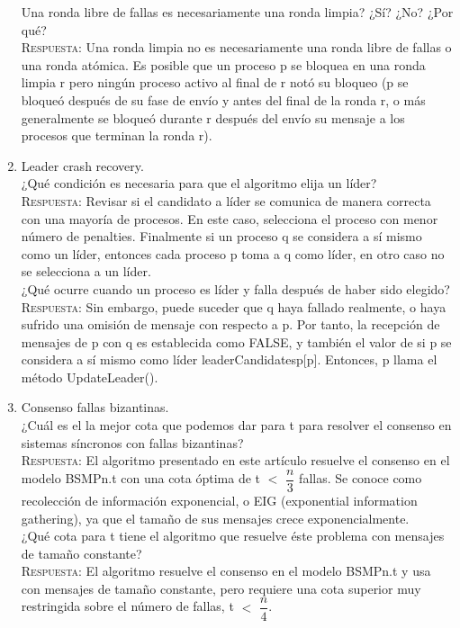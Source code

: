 \documentclass[letterpaper,10pt]{article}
\begin{document}
\begin{enumerate}
    Una ronda libre de fallas es necesariamente una ronda limpia? ¿Sí? ¿No? ¿Por qué?\\
    \textsc{Respuesta:}
	Una ronda limpia no es necesariamente una ronda libre de fallas o una ronda atómica. Es posible que un proceso p se bloquea en una ronda limpia r pero ningún proceso activo al final de r notó su bloqueo (p se bloqueó después de su fase de envío y antes del final de la ronda r, o más generalmente se bloqueó durante r después del envío su mensaje a los procesos que terminan la ronda r).\\
	    
    \item  Leader crash recovery.\\

	¿Qué condición es necesaria para que el algoritmo elija un líder?\\
    \textsc{Respuesta:}
    Revisar si el candidato a líder se comunica de manera correcta con una mayoría de procesos. En este caso, selecciona el proceso con menor número de penalties. Finalmente si un proceso q se considera a sí mismo como un líder, entonces cada proceso p toma a q como líder, en otro caso no se selecciona a un líder. \\
    
    ¿Qué ocurre cuando un proceso es líder y falla después de haber sido elegido?\\
    \textsc{Respuesta:}
	Sin embargo, puede suceder que q haya fallado realmente, o haya sufrido una omisión de mensaje con respecto a p. Por tanto, la recepción de mensajes de p con q es establecida como FALSE, y también el valor de si p se considera a sí mismo como líder leaderCandidatesp[p]. Entonces, p llama el método UpdateLeader().\\
	
    \item Consenso fallas bizantinas.\\

	¿Cuál es el la mejor cota que podemos dar para t para resolver el consenso en sistemas síncronos con fallas bizantinas?\\
    \textsc{Respuesta:}
    El algoritmo presentado en este artículo resuelve el consenso en el modelo BSMPn.t con una cota óptima de t $<$ $\dfrac{n}{3}$ fallas. Se conoce como recolección de información exponencial, o EIG (exponential information gathering), ya que el tamaño de sus mensajes crece exponencialmente.\\
    
    ¿Qué cota para t tiene el algoritmo que resuelve éste problema con mensajes de tamaño constante?\\
    \textsc{Respuesta:}
	El algoritmo resuelve el consenso en el modelo BSMPn.t y usa con mensajes de tamaño constante, pero requiere una cota superior muy restringida sobre el número de fallas,  t $<$ $\dfrac{n}{4}$. \\
		
	
	\end{enumerate} 
\end{document}
